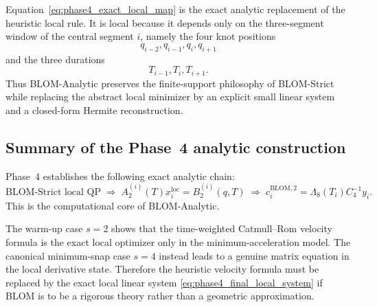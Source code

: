\begin{remark}
\label{rem:phase4_locality}
Equation~\eqref{eq:phase4_exact_local_map} is the exact analytic replacement of the heuristic local rule.
It is local because it depends only on the three-segment window of the central segment \(i\), namely the four knot positions
\[
q_{i-2},q_{i-1},q_i,q_{i+1}
\]
and the three durations
\[
T_{i-1},T_i,T_{i+1}.
\]
Thus BLOM-Analytic preserves the finite-support philosophy of BLOM-Strict while replacing the abstract local minimizer by an explicit small linear system and a closed-form Hermite reconstruction.
\end{remark}

\subsection{Summary of the Phase~4 analytic construction}
\label{subsec:phase4_summary}

Phase~4 establishes the following exact analytic chain:
\[
\boxed{
\text{BLOM-Strict local QP}
\;\Longrightarrow\;
A_2^{(i)}(T)x_i^{\mathrm{loc}}=B_2^{(i)}(q,T)
\;\Longrightarrow\;
c_i^{\mathrm{BLOM},2}
=
\Lambda_8(T_i)C_4^{-1}y_i.
}
\]
This is the computational core of BLOM-Analytic.

The warm-up case \(s=2\) shows that the time-weighted Catmull--Rom velocity formula is the exact local optimizer only in the minimum-acceleration model.
The canonical minimum-snap case \(s=4\) instead leads to a genuine matrix equation in the local derivative state.
Therefore the heuristic velocity formula must be replaced by the exact local linear system \eqref{eq:phase4_final_local_system} if BLOM is to be a rigorous theory rather than a geometric approximation.